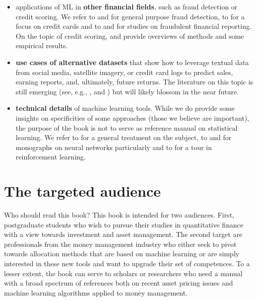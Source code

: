 \documentclass[]{krantz}
\providecommand{\tightlist}{%
  \setlength{\itemsep}{0pt}\setlength{\parskip}{0pt}}
\theoremstyle{definition}
\theoremstyle{definition}
\theoremstyle{definition}
\theoremstyle{remark}
\begin{document}
\begin{itemize}
\tightlist
\item
  applications of ML in \textbf{other financial fields}, such as fraud
  detection or credit scoring. We refer to \citet{ngai2011application}
  and \citet{baesens2015fraud} for general purpose fraud detection, to
  \citet{bhattacharyya2011data} for a focus on credit cards and to
  \citet{ravisankar2011detection} and \citet{abbasi2012metafraud} for
  studies on fraudulent financial reporting. On the topic of credit
  scoring, \citet{wang2011comparative} and \citet{brown2012experimental}
  provide overviews of methods and some empirical results.\\
\item
  \textbf{use cases of alternative datasets} that show how to leverage
  textual data from social media, satellite imagery, or credit card logs
  to predict sales, earning reports, and, ultimately, future returns.
  The literature on this topic is still emerging (see, e.g.,
  \citet{blank2019using}, \citet{jha2019implementing} and
  \citet{ke2019predicting}) but will likely blossom in the near
  future.\\
\item
  \textbf{technical details} of machine learning tools. While we do
  provide some insights on specificities of some approaches (those we
  believe are important), the purpose of the book is not to serve as
  reference manual on statistical learning. We refer to
  \citet{friedman2009elements} for a general treatment on the subject,
  to \citet{du2013neural} and \citet{goodfellow2016deep} for monographs
  on neural networks particularly and to \citet{sutton2018reinforcement}
  for a tour in reinforcement learning.
\end{itemize}

\hypertarget{the-targeted-audience}{%
\section{The targeted audience}\label{the-targeted-audience}}

Who should read this book? This book is intended for two audiences.
First, postgraduate students who wish to pursue their studies in
quantitative finance with a view towards investment and asset
management. The second target are professionals from the money
management industry who either seek to pivot towards allocation methods
that are based on machine learning or are simply interested in these new
tools and want to upgrade their set of competences. To a lesser extent,
the book can serve to scholars or researchers who need a manual with a
broad spectrum of references both on recent asset pricing issues and
machine learning algorithms applied to money management.
\end{document}
